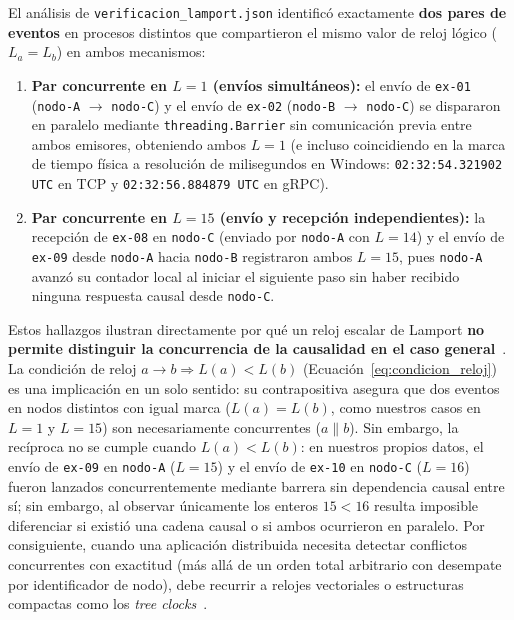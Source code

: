 \documentclass[12pt,a4paper]{article}
\begin{document}
El análisis de \texttt{verificacion\_lamport.json} identificó exactamente \textbf{dos pares de eventos} en procesos distintos que compartieron el mismo valor de reloj lógico ($L_a = L_b$) en ambos mecanismos:
\begin{enumerate}
  \item \textbf{Par concurrente en $L = 1$ (envíos simultáneos):} el envío de \texttt{ex-01} (\texttt{nodo-A} $\to$ \texttt{nodo-C}) y el envío de \texttt{ex-02} (\texttt{nodo-B} $\to$ \texttt{nodo-C}) se dispararon en paralelo mediante \texttt{threading.Barrier} sin comunicación previa entre ambos emisores, obteniendo ambos $L = 1$ (e incluso coincidiendo en la marca de tiempo física a resolución de milisegundos en Windows: \texttt{02:32:54.321902\,UTC} en TCP y \texttt{02:32:56.884879\,UTC} en gRPC).
  \item \textbf{Par concurrente en $L = 15$ (envío y recepción independientes):} la recepción de \texttt{ex-08} en \texttt{nodo-C} (enviado por \texttt{nodo-A} con $L = 14$) y el envío de \texttt{ex-09} desde \texttt{nodo-A} hacia \texttt{nodo-B} registraron ambos $L = 15$, pues \texttt{nodo-A} avanzó su contador local al iniciar el siguiente paso sin haber recibido ninguna respuesta causal desde \texttt{nodo-C}.
\end{enumerate}

Estos hallazgos ilustran directamente por qué un reloj escalar de Lamport \textbf{no permite distinguir la concurrencia de la causalidad en el caso general}~\cite{castello2024inductive,mathur2022treeclock}. La condición de reloj $a \rightarrow b \Rightarrow L(a) < L(b)$ (Ecuación~\eqref{eq:condicion_reloj}) es una implicación en un solo sentido: su contrapositiva asegura que dos eventos en nodos distintos con igual marca ($L(a) = L(b)$, como nuestros casos en $L = 1$ y $L = 15$) son necesariamente concurrentes ($a \parallel b$). Sin embargo, la recíproca no se cumple cuando $L(a) < L(b)$: en nuestros propios datos, el envío de \texttt{ex-09} en \texttt{nodo-A} ($L = 15$) y el envío de \texttt{ex-10} en \texttt{nodo-C} ($L = 16$) fueron lanzados concurrentemente mediante barrera sin dependencia causal entre sí; sin embargo, al observar únicamente los enteros $15 < 16$ resulta imposible diferenciar si existió una cadena causal o si ambos ocurrieron en paralelo. Por consiguiente, cuando una aplicación distribuida necesita detectar conflictos concurrentes con exactitud (más allá de un orden total arbitrario con desempate por identificador de nodo), debe recurrir a relojes vectoriales o estructuras compactas como los \emph{tree clocks}~\cite{mathur2022treeclock,haseeb2025beyond}.
\end{document}
